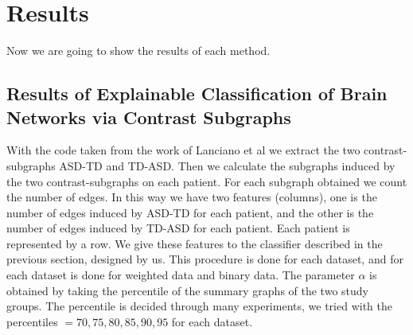\section{Results}

Now we are going to show the results of each method.
\vspace{0.5cm}

\subsection{Results of Explainable Classification of Brain Networks via Contrast Subgraphs}

With the code taken from the work of Lanciano et al \cite{lanciano2020cs} we extract the two contrast-subgraphs ASD-TD and TD-ASD. Then we calculate the subgraphs induced by the two contrast-subgraphs on each patient. For each subgraph obtained we count the number of edges. In this way we have two features (columns), one is the number of edges induced by ASD-TD for each patient, and the other is the number of edges induced by TD-ASD for each patient.  Each patient is represented by a row. We give these features to the classifier described in the previous section, designed by us. This procedure is done for each dataset, and for each dataset is done for weighted data and binary data. The parameter $\alpha$ is obtained by taking the percentile of the summary graphs of the two study groups. The percentile is decided through many experiments, we tried with the percentiles $ = {70, 75, 80, 85, 90, 95}$ for each dataset.
\vspace{0.5cm}

